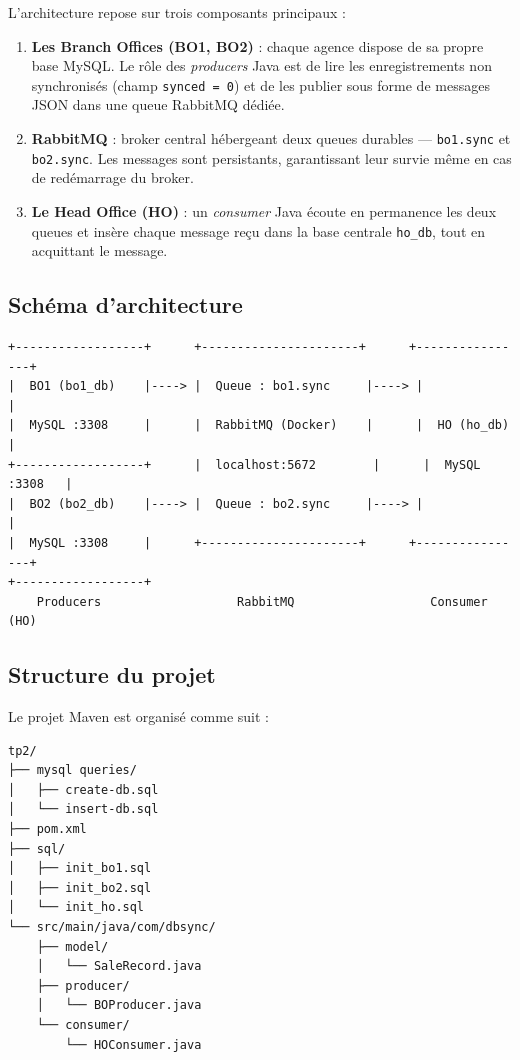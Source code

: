 \documentclass[a4paper,12pt]{article}
\begin{document}
L'architecture repose sur trois composants principaux :

\begin{enumerate}
    \item \textbf{Les Branch Offices (BO1, BO2)} : chaque agence dispose de sa propre base MySQL. Le rôle des \textit{producers} Java est de lire les enregistrements non synchronisés (champ \texttt{synced = 0}) et de les publier sous forme de messages JSON dans une queue RabbitMQ dédiée.
    \item \textbf{RabbitMQ} : broker central hébergeant deux queues durables — \texttt{bo1.sync} et \texttt{bo2.sync}. Les messages sont persistants, garantissant leur survie même en cas de redémarrage du broker.
    \item \textbf{Le Head Office (HO)} : un \textit{consumer} Java écoute en permanence les deux queues et insère chaque message reçu dans la base centrale \texttt{ho\_db}, tout en acquittant le message.
\end{enumerate}

\subsection{Schéma d'architecture}

\begin{verbatim}
+------------------+      +----------------------+      +----------------+
|  BO1 (bo1_db)    |----> |  Queue : bo1.sync     |----> |                |
|  MySQL :3308     |      |  RabbitMQ (Docker)    |      |  HO (ho_db)    |
+------------------+      |  localhost:5672        |      |  MySQL :3308   |
|  BO2 (bo2_db)    |----> |  Queue : bo2.sync     |----> |                |
|  MySQL :3308     |      +----------------------+      +----------------+
+------------------+
    Producers                   RabbitMQ                   Consumer (HO)
\end{verbatim}

\subsection{Structure du projet}

Le projet Maven est organisé comme suit :

\begin{verbatim}
tp2/
├── mysql queries/
│   ├── create-db.sql
│   └── insert-db.sql
├── pom.xml
├── sql/
│   ├── init_bo1.sql
│   ├── init_bo2.sql
│   └── init_ho.sql
└── src/main/java/com/dbsync/
    ├── model/
    │   └── SaleRecord.java
    ├── producer/
    │   └── BOProducer.java
    └── consumer/
        └── HOConsumer.java
\end{verbatim}
\end{document}
